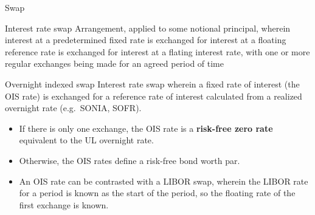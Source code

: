\documentclass[
  ignorenonframetext,
  aspectratio=169]{beamer}
\providecommand{\tightlist}{%
  \setlength{\itemsep}{0pt}\setlength{\parskip}{0pt}}
\begin{document}
\begin{frame}{Swap}
\protect\hypertarget{swap}{}
\begin{block}{Interest rate swap}
\protect\hypertarget{interest-rate-swap}{}
Arrangement, applied to some notional principal, wherein interest at a
predetermined fixed rate is exchanged for interest at a floating
reference rate is exchanged for interest at a flating interest rate,
with one or more regular exchanges being made for an agreed period of
time

\end{block}
\end{frame}

\begin{frame}
\begin{block}{Overnight indexed swap}
\protect\hypertarget{overnight-indexed-swap}{}
Interest rate swap wherein a fixed rate of interest (the OIS rate) is
exchanged for a reference rate of interest calculated from a realized
overnight rate (e.g.~SONIA, SOFR).

\begin{itemize}
\tightlist
\item
  If there is only one exchange, the OIS rate is a \textbf{risk-free
  zero rate} equivalent to the UL overnight rate.
\item
  Otherwise, the OIS rates define a risk-free bond worth par.
\item
  An OIS rate can be contrasted with a LIBOR swap, wherein the LIBOR
  rate for a period is known as the start of the period, so the floating
  rate of the first exchange is known.
\end{itemize}
\end{block}
\end{frame}
\end{document}
